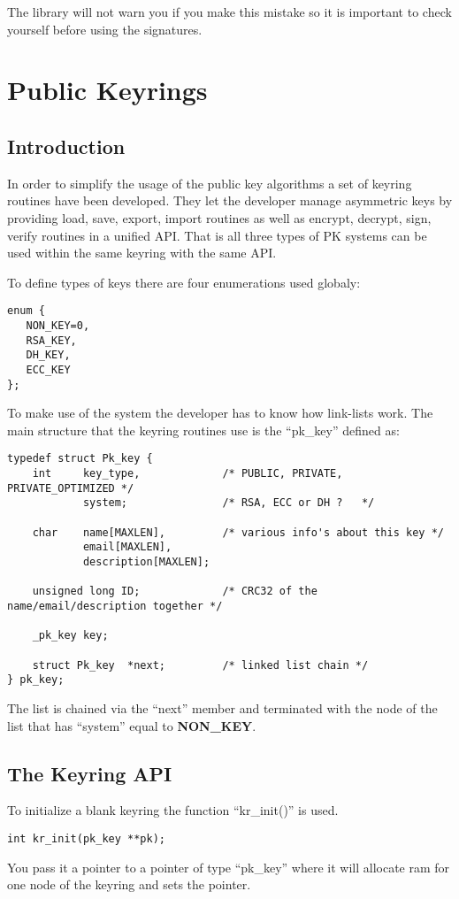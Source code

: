 \documentclass{book}
\begin{document}
The library will not warn you if you make this mistake so it is important to check yourself before using the 
signatures.

\chapter{Public Keyrings}
\section{Introduction}
In order to simplify the usage of the public key algorithms a set of keyring routines have been developed.  They let the 
developer manage asymmetric keys by providing load, save, export, import routines as well as encrypt, decrypt, sign, verify
routines in a unified API.  That is all three types of PK systems can be used within the same keyring with the same API.

To define types of keys there are four enumerations used globaly:
\begin{verbatim}
enum {
   NON_KEY=0,
   RSA_KEY,
   DH_KEY,
   ECC_KEY
};
\end{verbatim}

To make use of the system the developer has to know how link-lists work.  The main structure that the keyring routines use 
is the ``pk\_key'' defined as:
\begin{small}
\begin{verbatim}
typedef struct Pk_key {
    int     key_type,             /* PUBLIC, PRIVATE, PRIVATE_OPTIMIZED */
            system;               /* RSA, ECC or DH ?   */

    char    name[MAXLEN],         /* various info's about this key */
            email[MAXLEN],
            description[MAXLEN];

    unsigned long ID;             /* CRC32 of the name/email/description together */

    _pk_key key;

    struct Pk_key  *next;         /* linked list chain */
} pk_key;
\end{verbatim}
\end{small}

The list is chained via the ``next'' member and terminated with the node of the list that has ``system'' equal to 
{\bf NON\_KEY}.

\section{The Keyring API}
To initialize a blank keyring the function ``kr\_init()'' is used.
\begin{verbatim}
int kr_init(pk_key **pk);
\end{verbatim}
You pass it a pointer to a pointer of type ``pk\_key'' where it will allocate ram for one node of the keyring and sets the
pointer.
\end{document}
